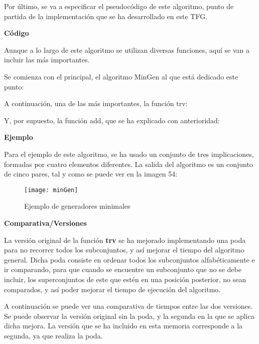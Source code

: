     Por \'ultimo, se va a especificar el pseudoc\'odigo de este algoritmo, punto de partida de la implementaci\'on que se ha desarrollado en este TFG.
    \bigskip

    

    \bigskip

    \bigskip

    \textbf{C\'odigo}

    Aunque a lo largo de este algoritmo se utilizan diversas funciones, aqu\'i se van a incluir las m\'as importantes.
    
    Se comienza con el principal, el algoritmo MinGen al que est\'a dedicado este punto:

    

    A continuaci\'on, una de las m\'as importantes, la funci\'on trv:

    

    Y, por supuesto, la funci\'on add, que se ha explicado con anterioridad:

    

    \bigskip
    \textbf{Ejemplo}

    Para el ejemplo de este algoritmo, se ha usado un conjunto de tres implicaciones, formadas por cuatro elementos diferentes.
    La salida del algoritmo es un conjunto de cinco pares, tal y como se puede ver en la imagen 54:

    \begin{figure}[H]
        \centering
        \texttt{[image: minGen]}
        \caption{Ejemplo de generadores minimales}
        \label{fig:minGen}
    \end{figure}

    

    \clearpage
    \textbf{Comparativa/Versiones}

    La versi\'on original de la funci\'on \textbf{trv} se ha mejorado implementando una poda para no recorrer todos los subconjuntos, y as\'i 
    mejorar el tiempo del algoritmo general. Dicha poda consiste en ordenar todos los subconjuntos alfab\'eticamente e ir comparando, para que 
    cuando se encuentre un subconjunto que no se debe incluir, los superconjuntos de este que est\'en en una posici\'on posterior, no sean 
    comparados, y as\'i poder mejorar el tiempo de ejecuci\'on del algoritmo.

    A continuaci\'on se puede ver una comparativa de tiempos entre las dos versiones. Se puede observar la versi\'on original sin la poda, y 
    la segunda en la que se aplica dicha mejora. La versi\'on que se ha incluido en esta memoria corresponde a la segunda, ya que 
    realiza la poda.

